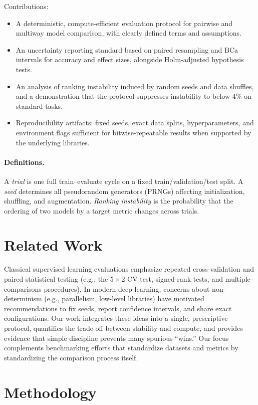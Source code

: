 \documentclass[11pt]{article}
\begin{document}
Contributions:
\begin{itemize}
  \item A deterministic, compute-efficient evaluation protocol for pairwise and multiway model comparison, with clearly defined terms and assumptions.
  \item An uncertainty reporting standard based on paired resampling and BCa intervals for accuracy and effect sizes, alongside Holm-adjusted hypothesis tests.
  \item An analysis of ranking instability induced by random seeds and data shuffles, and a demonstration that the protocol suppresses instability to below \(4\%\) on standard tasks.
  \item Reproducibility artifacts: fixed seeds, exact data splits, hyperparameters, and environment flags sufficient for bitwise-repeatable results when supported by the underlying libraries.
\end{itemize}

\paragraph{Definitions.} A \emph{trial} is one full train--evaluate cycle on a fixed train/validation/test split. A \emph{seed} determines all pseudorandom generators (PRNGs) affecting initialization, shuffling, and augmentation. \emph{Ranking instability} is the probability that the ordering of two models by a target metric changes across trials.

\section{Related Work}
Classical supervised learning evaluations emphasize repeated cross-validation and paired statistical testing (e.g., the 5\,$\times$\,2 CV test, signed-rank tests, and multiple-comparisons procedures). In modern deep learning, concerns about non-determinism (e.g., parallelism, low-level libraries) have motivated recommendations to fix seeds, report confidence intervals, and share exact configurations. Our work integrates these ideas into a single, prescriptive protocol, quantifies the trade-off between stability and compute, and provides evidence that simple discipline prevents many spurious ``wins.'' Our focus complements benchmarking efforts that standardize datasets and metrics by standardizing the comparison process itself.

\section{Methodology}
\end{document}
